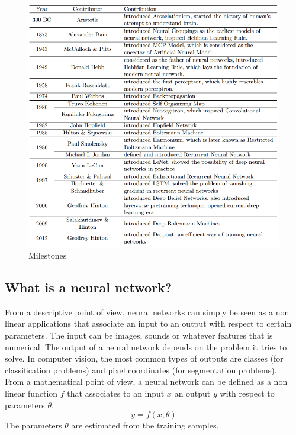 \begin{figure}[!h]
\centering
\includegraphics[width=1\textwidth, keepaspectratio=true]{./figures/history.png}
\caption{Milestones }
\label{history}
\end{figure}

 
\subsection{What is a neural network?}
\label{what_is_a_neural_network}

From a descriptive point of view, neural networks can simply be seen as a non linear applications that associate an input to an output with respect to certain parameters. The input can be images, sounds or whatever features that is numerical. The output of a neural network depends on the problem it tries to solve. In computer vision, the most common types of outputs  are classes (for classification problems) and pixel coordinates (for segmentation problems).\\
From a mathematical point of view, a neural network can be defined as a non linear function $f$ that associates to an input $x$ an output $y$ with respect to parameters $\theta$.
\begin{equation}
y = f(x,\theta)
\end{equation}
The parameters $\theta$ are estimated from the training samples.

